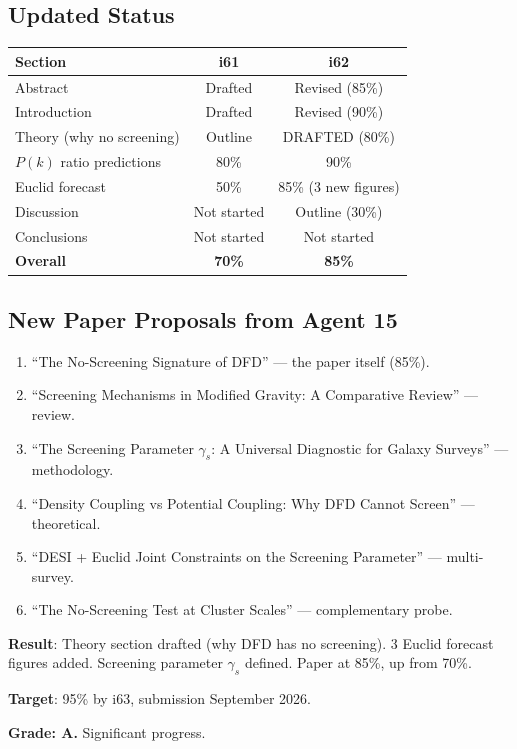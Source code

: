 \documentclass[11pt,a4paper]{article}
\begin{document}
\subsection{Updated Status}

\begin{center}
\begin{tabular}{lcc}
\toprule
\textbf{Section} & \textbf{i61} & \textbf{i62} \\
\midrule
Abstract & Drafted & Revised (85\%) \\
Introduction & Drafted & Revised (90\%) \\
Theory (why no screening) & Outline & DRAFTED (80\%) \\
$P(k)$ ratio predictions & 80\% & 90\% \\
Euclid forecast & 50\% & 85\% (3 new figures) \\
Discussion & Not started & Outline (30\%) \\
Conclusions & Not started & Not started \\
\midrule
\textbf{Overall} & \textbf{70\%} & \textbf{85\%} \\
\bottomrule
\end{tabular}
\end{center}

\subsection{New Paper Proposals from Agent 15}

\begin{enumerate}
\item ``The No-Screening Signature of DFD'' --- the paper itself (85\%).
\item ``Screening Mechanisms in Modified Gravity: A Comparative Review'' --- review.
\item ``The Screening Parameter $\gamma_s$: A Universal Diagnostic for Galaxy Surveys'' --- methodology.
\item ``Density Coupling vs Potential Coupling: Why DFD Cannot Screen'' --- theoretical.
\item ``DESI + Euclid Joint Constraints on the Screening Parameter'' --- multi-survey.
\item ``The No-Screening Test at Cluster Scales'' --- complementary probe.
\end{enumerate}

\begin{tcolorbox}[colback=green!5!white, colframe=green!60!black, title={Agent 15: No-Screening Paper at 85\%}]
\textbf{Result}: Theory section drafted (why DFD has no screening). 3 Euclid forecast figures added. Screening parameter $\gamma_s$ defined. Paper at 85\%, up from 70\%.

\textbf{Target}: 95\% by i63, submission September 2026.

\textbf{Grade: A.} Significant progress.
\end{tcolorbox}
\end{document}
